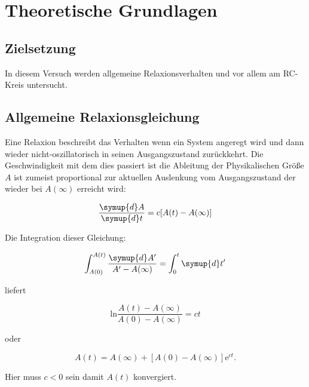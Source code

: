 \section{Theoretische Grundlagen}

    \subsection{Zielsetzung}

        \noindent In diesem Versuch werden allgemeine Relaxionsverhalten und vor allem am RC-Kreis untersucht.

    \subsection{Allgemeine Relaxionsgleichung}

        \noindent Eine Relaxion beschreibt das Verhalten wenn ein System angeregt wird und dann wieder nicht-oszillatorisch in seinen 
        Ausgangszustand zurückkehrt. Die Geschwindigkeit mit dem dies passiert ist die Ableitung der Physikalischen Größe $A$ ist zumeist 
        proportional zur aktuellen Auslenkung vom Ausgangszustand der wieder bei $A(\infty)$ erreicht wird:

        \begin{equation}
            \frac{\symup{d}A}{\symup{d}t}=c[A(t)-A(\infty)]
            \label{eqn:1}
        \end{equation}

        \noindent Die Integration dieser Gleichung:

        \begin{equation*}
            \int_{A(0)}^{A(t)} \frac{\symup{d}A'}{A' - A(\infty)} = \int_0^t \symup{d}t'
        \end{equation*}

        \noindent liefert

        \begin{equation*}
            \text{ln} \frac{A(t) - A(\infty)}{A(0) - A(\infty)} = ct
        \end{equation*}

        \noindent oder

        \begin{equation}
            A(t) = A(\infty) + [A(0) - A(\infty)] \text{e}^{ct} . 
            \label{eqn:2}
        \end{equation}

        \noindent Hier muss $c < 0$ sein damit $A(t)$ konvergiert.

